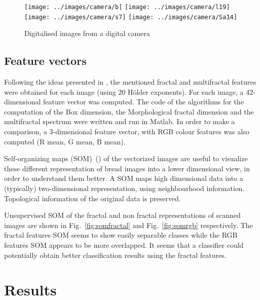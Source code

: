 \begin{figure}[htb]
\centering
\texttt{[image: ../images/camera/b]}
\texttt{[image: ../images/camera/l19]}
\texttt{[image: ../images/camera/s7]}
\texttt{[image: ../images/camera/Sa14]}
\caption{Digitalised images from a digital camera}
\label{fig:camera}
\end{figure}

\subsection{Feature vectors}
\label{sec:8}
Following the ideas presented in \cite{Gonzales2008}, the mentioned fractal and multifractal features were obtained for each image (using $20$ H\"older exponents). For each image, a $42$-dimensional feature vector was computed. The code of the algorithms for the computation of the Box dimension, the Morphological fractal dimension and the multifractal spectrum were written and run in Matlab. In order to make a comparison, a $3$-dimensional feature vector, with RGB colour features was also computed (R mean, G mean, B mean).

Self-organizing maps (SOM)~(\cite{Kohonen2001}) of the vectorized images are useful to visualize these different representation of bread images into a lower dimensional view, in order to understand them better. A SOM maps high dimensional data into a (typically) two-dimensional representation, using neighbourhood information. Topological information of the original data is preserved.  

Unsupervised SOM of the fractal and non fractal representations of scanned images are shown in Fig.~\ref{fig:somfractal} and Fig.~\ref{fig:somrgb} respectively. The fractal features SOM seems to show easily separable classes while the RGB features SOM appears to be more overlapped. It seems that a classifier could potentially obtain better classification results using the fractal features.


\section{Results}
\label{sec:9}
